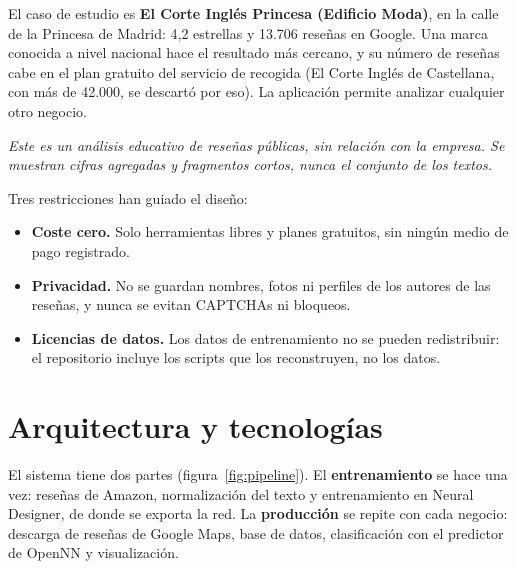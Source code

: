 \documentclass[11pt,a4paper]{article}
\begin{document}
El caso de estudio es \textbf{El Corte Inglés Princesa (Edificio Moda)}, en la calle de la Princesa de Madrid:
4,2 estrellas y 13.706 reseñas en Google. Una marca conocida a nivel nacional hace el resultado más cercano, y su
número de reseñas cabe en el plan gratuito del servicio de recogida (El Corte Inglés de Castellana, con más de
42.000, se descartó por eso). La aplicación permite analizar cualquier otro negocio.

\emph{Este es un análisis educativo de reseñas públicas, sin relación con la empresa. Se muestran cifras
agregadas y fragmentos cortos, nunca el conjunto de los textos.}

Tres restricciones han guiado el diseño:
\begin{itemize}
  \item \textbf{Coste cero.} Solo herramientas libres y planes gratuitos, sin ningún medio de pago registrado.
  \item \textbf{Privacidad.} No se guardan nombres, fotos ni perfiles de los autores de las reseñas, y nunca se
        evitan CAPTCHAs ni bloqueos.
  \item \textbf{Licencias de datos.} Los datos de entrenamiento no se pueden redistribuir: el repositorio incluye
        los scripts que los reconstruyen, no los datos.
\end{itemize}

\section{Arquitectura y tecnologías}

El sistema tiene dos partes (figura~\ref{fig:pipeline}). El \textbf{entrenamiento} se hace una vez: reseñas de
Amazon, normalización del texto y entrenamiento en Neural Designer, de donde se exporta la red. La
\textbf{producción} se repite con cada negocio: descarga de reseñas de Google Maps, base de datos, clasificación con
el predictor de OpenNN y visualización.
\end{document}
